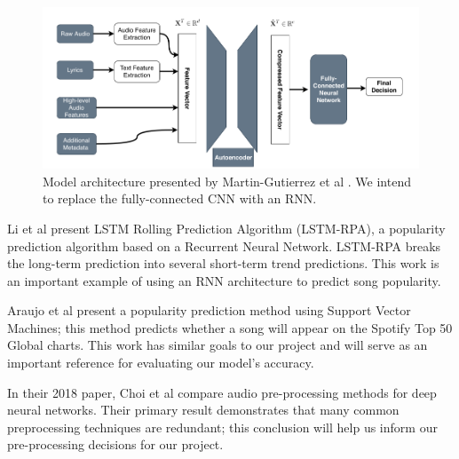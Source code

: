 \documentclass[11pt]{article}
\begin{document}
\begin{figure}
    \centering 
    \includegraphics[width=5in]{figs/architecture.png}
    \caption{Model architecture presented by Martin-Gutierrez et al \cite{martin-gutierrez_multimodal_2020}. We intend to replace the fully-connected CNN with an RNN.}
    \label{architecture}
\end{figure}

Li et al \cite{li_lstm-rpa_2021} present LSTM Rolling Prediction Algorithm (LSTM-RPA), a popularity prediction algorithm based on a Recurrent Neural Network. LSTM-RPA breaks the long-term prediction into several short-term trend predictions. This work is an important example of using an RNN architecture to predict song popularity. 
    
Araujo et al \cite{araujo_predicting_2019} present a popularity prediction method using Support Vector Machines; this method predicts whether a song will appear on the Spotify Top 50 Global charts. This work has similar goals to our project and will serve as an important reference for evaluating our model’s accuracy.

In their 2018 paper, Choi et al \cite{choi_comparison_2018} compare audio pre-processing methods for deep neural networks. Their primary result demonstrates that many common preprocessing techniques are redundant; this conclusion will help us inform our pre-processing decisions for our project.

% 
\end{document}
